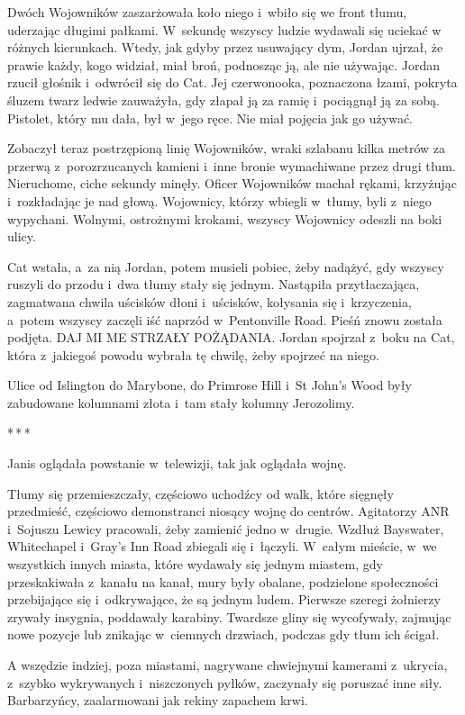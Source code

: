 \documentclass[oneside,polish,11pt,sfheadings]{mwbk}
\newcommand{\threeast}{\bigskip\par\centerline{*\,*\,*}\medskip\par}%
\begin{document}
Dwóch Wojowników zaszarżowała koło niego i~wbiło się we front tłumu,
uderzając długimi pałkami. W~sekundę wszyscy ludzie wydawali się uciekać
w różnych kierunkach. Wtedy, jak gdyby przez usuwający dym, Jordan
ujrzał, że prawie każdy, kogo widział, miał broń, podnosząc ją, ale nie
używając. Jordan rzucił głośnik i~odwrócił się do Cat. Jej czerwonooka,
poznaczona łzami, pokryta śluzem twarz ledwie zauważyła, gdy złapał ją
za ramię i~pociągnął ją za sobą. Pistolet, który mu dała, był w~jego
ręce. Nie miał pojęcia jak go używać.

Zobaczył teraz postrzępioną linię Wojowników, wraki szlabanu kilka
metrów za przerwą z~porozrzucanych kamieni i~inne bronie wymachiwane
przez drugi tłum. Nieruchome, ciche sekundy minęły. Oficer Wojowników
machał rękami, krzyżując i~rozkładając je nad głową. Wojownicy, którzy
wbiegli w~tłumy, byli z~niego wypychani. Wolnymi, ostrożnymi krokami,
wszyscy Wojownicy odeszli na boki ulicy.

Cat wstała, a~za nią Jordan, potem musieli pobiec, żeby nadążyć, gdy
wszyscy ruszyli do przodu i~dwa tłumy stały się jednym. Nastąpiła
przytłaczająca, zagmatwana chwila uścisków dłoni i~uścisków, kołysania
się i~krzyczenia, a~potem wszyscy zaczęli iść naprzód w~Pentonville
Road. Pieśń znowu została podjęta. DAJ MI ME STRZAŁY POŻĄDANIA. Jordan
spojrzał z~boku na Cat, która z~jakiegoś powodu wybrała tę chwilę, żeby
spojrzeć na niego.

Ulice od Islington do Marybone, do Primrose Hill i~St John's Wood były
zabudowane kolumnami złota i~tam stały kolumny Jerozolimy.
  \threeast 

Janis oglądała powstanie w~telewizji, tak jak oglądała wojnę.

Tłumy się przemieszczały, częściowo uchodźcy od walk, które sięgnęły
przedmieść, częściowo demonstranci niosący wojnę do centrów. Agitatorzy
ANR i~Sojuszu Lewicy pracowali, żeby zamienić jedno w~drugie. Wzdłuż
Bayswater, Whitechapel i~Gray's Inn Road zbiegali się i~łączyli. W~całym
mieście, w~we wszystkich innych miasta, które wydawały się jednym
miastem, gdy przeskakiwała z~kanału na kanał, mury były obalane,
podzielone społeczności przebijające się i~odkrywające, że są jednym
ludem. Pierwsze szeregi żołnierzy zrywały insygnia, poddawały karabiny.
Twardsze gliny się wycofywały, zajmując nowe pozycje lub znikając w~ciemnych drzwiach, podczas gdy tłum ich ścigał.

A wszędzie indziej, poza miastami, nagrywane chwiejnymi kamerami z~ukrycia, z~szybko wykrywanych i~niszczonych pyłków, zaczynały się
poruszać inne siły. Barbarzyńcy, zaalarmowani jak rekiny zapachem krwi.
\end{document}
